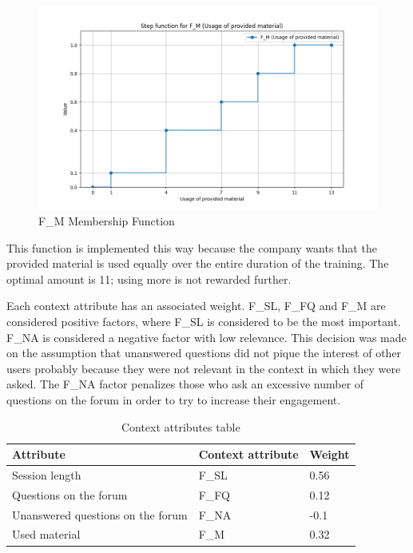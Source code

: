 \begin{figure}[H]
    \centering
    \includegraphics[width=\textwidth]{./assets/plot_F_M.png}
    \caption{F\_M Membership Function}
    \label{fig:plot_F_M}
\end{figure}
This function is implemented this way because the company wants that the provided material is used equally over the entire duration of the training. The optimal amount is 11; using more is not rewarded further.


Each context attribute has an associated weight. F\_SL, F\_FQ and F\_M are considered positive factors, where F\_SL is considered to be the most important. F\_NA is considered a negative factor with low relevance. This decision was made on the assumption that unanswered questions did not pique the interest of other users probably because they were not relevant in the context in which they were asked. The F\_NA factor penalizes those who ask an excessive number of questions on the forum in order to try to increase their engagement.

\begin{table}[H]
    \begin{center}
    \begin{tabular}{ | m{7cm} | m{4cm}| m{4cm} | } 
      \hline
      \textbf{Attribute} & \textbf{Context attribute}  & \textbf{Weight}  \\ 
      \hline
      Session length & F\_SL & 0.56 \\ 
      \hline
      Questions on the forum & F\_FQ & 0.12 \\
      \hline
      Unanswered questions on the forum & F\_NA & -0.1 \\
      \hline
      Used material & F\_M & 0.32 \\
      \hline
    \end{tabular}
    \end{center}
    \caption{Context attributes table}
\end{table}

